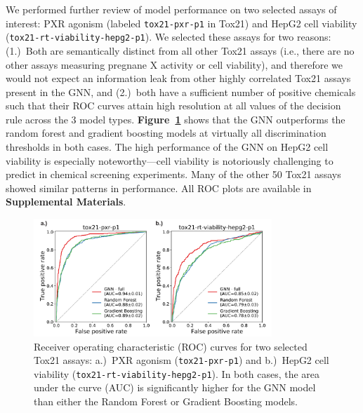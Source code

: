\documentclass{ws-procs11x85}
\begin{document}
We performed further review of model performance on two selected assays of interest: PXR agonism (labeled \texttt{tox21-pxr-p1} in Tox21) and HepG2 cell viability (\texttt{tox21-rt-viability-hepg2-p1}).
We selected these assays for two reasons: (1.)~Both are semantically distinct from all other Tox21 assays (i.e., there are no other assays measuring pregnane X activity or cell viability), and therefore we would not expect an information leak from other highly correlated Tox21 assays present in the GNN, and (2.)~both have a sufficient number of positive chemicals such that their ROC curves attain high resolution at all values of the decision rule across the 3 model types.
\textbf{Figure~\ref{fig:4}} shows that the GNN outperforms the random forest and gradient boosting models at virtually all discrimination thresholds in both cases. 
The high performance of the GNN on HepG2 cell viability is especially noteworthy---cell viability is notoriously challenging to predict in chemical screening experiments.
Many of the other 50 Tox21 assays showed similar patterns in performance.
All ROC plots are available in \textbf{Supplemental Materials}.

\begin{figure}
   \centering
   \includegraphics[width=0.8\textwidth]{figures/figure4.pdf}
   \caption{Receiver operating characteristic (ROC) curves for two selected Tox21 assays: a.)~PXR agonism (\texttt{tox21-pxr-p1}) and b.)~HepG2 cell viability (\texttt{tox21-rt-viability-hepg2-p1}). In both cases, the area under the curve (AUC) is significantly higher for the GNN model than either the Random Forest or Gradient Boosting models.}\label{fig:4}
\end{figure}
\end{document}
